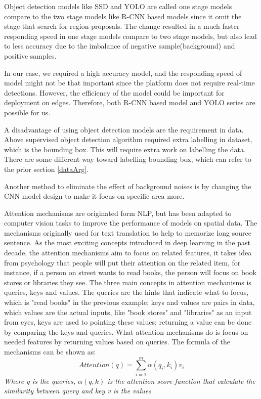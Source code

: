                     Object detection models like SSD and YOLO are called one stage models compare to the two stage models like R-CNN based models since it omit the stage that search for region proposals. The change resulted in a much faster responding speed in one stage models compare to two stage models, but also lead to less accuracy due to the imbalance of negative sample(background) and positive samples.

                    In our case, we required a high accuracy model, and the responding speed of model might not be that important since the platform does not require real-time detections. However, the efficiency of the model could be important for deployment on edges. Therefore, both R-CNN based model and YOLO series are possible for us.
                    
                    A disadvantage of using object detection models are the requirement in data. Above supervised object detection algorithm required extra labelling in dataset, which is the bounding box. This will require extra work on labelling the data. There are some different way toward labelling bounding box, which can refer to the prior section \ref{dataArg}.

                    Another method to eliminate the effect of background noises is by changing the CNN model design to make it focus on specific area more.

                    Attention mechanisms are originated form NLP, but has been adapted to computer vision tasks to improve the performance of models on spatial data. The mechanisms originally used for text translation to help to memorize long source sentence\cite{bahdanau2014neural}. As the most exciting concepts introduced in deep learning in the past decade, the attention mechanisms aim to focus on related features, it takes idea from psychology that people will put their attention on the related item, for instance, if a person on street wants to read books, the person will focus on book stores or libraries they see. The three main concepts in attention mechanisms is queries, keys and values. The queries are the hints that indicate what to focus, which is "read books" in the previous example; keys and values are pairs in data, which values are the actual inputs, like "book stores" and "libraries" as an input from eyes, keys are used to pointing these values; returning a value can be done by comparing the keys and queries. What attention mechanisms do is focus on needed features by returning values based on queries. The formula of the mechanisms can be shown as:
                    \[
                        Attention(q)=\sum_{i=1}^{m}\alpha(q_i,k_i)v_i
                    \]
                    \textit{Where q is the queries, $\alpha(q,k)$ is the attention score function that calculate the similarity between query and key v is the values}

